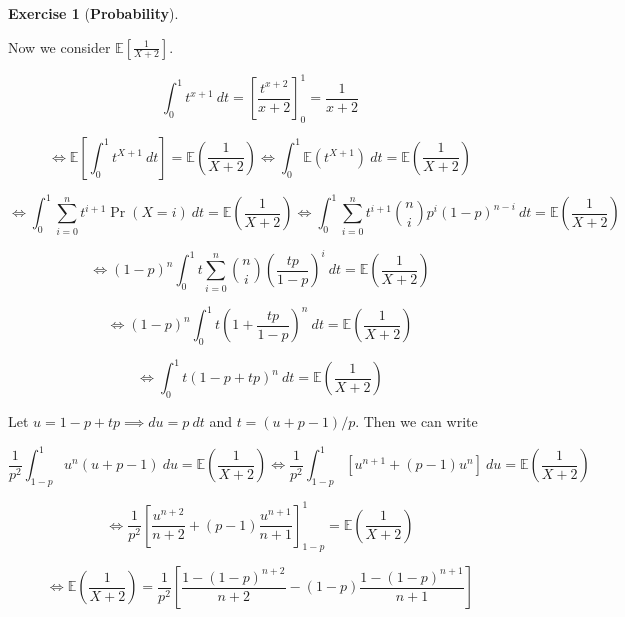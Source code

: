 \documentclass{article}
\theoremstyle{definition}
\newtheorem{exercise}{Exercise}
\theoremstyle{definition}
\theoremstyle{definition}
\theoremstyle{definition}
\theoremstyle{definition}
\newcommand{\E}{\mathbb{E}}
\begin{document}
\begin{exercise}[\textbf{Probability}]
\begin{enumerate}[(a)]
Now we consider \(\E \left[ \frac{1}{X+2} \right] \). 

\[
\int_0^1 t^{x+1}  \ dt = \left[ \frac{t^{x+2}}{x+2} \right]_0^1 =  \frac{1}{x+2}
\]

\[
 \iff \E \left[ \int_0^1 t^{X+1}  \ dt \right] = \E \left( \frac{1}{X+2} \right)  \iff \int_0^1 \E ( t^{X+1})  \ dt = \E \left( \frac{1}{X+2} \right)
\]

\[
\iff \int_0^1 \sum_{i=0}^n t^{i+1} \Pr(X = i) \ dt = \E \left( \frac{1}{X+2} \right) \iff \int_0^1 \sum_{i=0}^n t^{i+1} \binom{n}{i} p^i (1-p)^{n-i} \ dt = \E \left( \frac{1}{X+2} \right)
\]

\[
 \iff (1-p)^n \int_0^1 t\sum_{i=0}^n \binom{n}{i} \left( \frac{tp}{1-p} \right) ^i  \ dt = \E \left( \frac{1}{X+2} \right)
\]

\[
 \iff (1-p)^n \int_0^1t \left( 1 + \frac{tp}{1-p} \right)^n  \ dt = \E \left( \frac{1}{X+2} \right)
\]

\[
 \iff  \int_0^1 t\left( 1 - p + tp  \right)^n  \ dt = \E \left( \frac{1}{X+2} \right)
\]

Let \(u = 1 - p + tp \implies du = p \ dt\) and \(t = (u + p - 1)/p\). Then we can write

\[
\frac{1}{p^2} \int_{1-p}^1 u^n (u + p - 1) \ du = \E \left( \frac{1}{X+2} \right) \iff  \frac{1}{p^2} \int_{1-p}^1 [u^{n+1} + (p - 1)u^n] \ du = \E \left( \frac{1}{X+2} \right) 
\]

\[
\iff  \frac{1}{p^2} \left[\frac{u^{n+2}}{n+2} + (p - 1)\frac{u^{n+1}}{n+1} \right]_{1-p}^1 = \E \left( \frac{1}{X+2} \right) 
\]

\[
\iff   \E \left( \frac{1}{X+2} \right)  = \frac{1}{p^2} \left[\frac{1 - (1-p)^{n+2}}{n+2} - (1 - p)\frac{1 - (1-p)^{n+1}}{n+1} \right]
\]


\end{enumerate}
\end{exercise}
\end{document}
